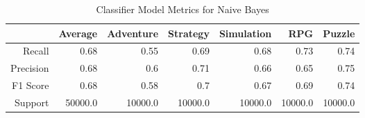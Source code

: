 \begin{table}[h]
    \centering
    \begin{tabular}{r|r|r|r|r|r|r}
        & Average & Adventure & Strategy & Simulation & RPG & Puzzle \\\hline
        Recall      & 0.68 & 0.55 & 0.69 & 0.68 & 0.73 & 0.74\\
        Precision   & 0.68 & 0.6 & 0.71 & 0.66 & 0.65 & 0.75\\
        F1 Score    & 0.68 & 0.58 & 0.7 & 0.67 & 0.69 & 0.74\\
        Support     & 50000.0 & 10000.0 & 10000.0 & 10000.0 & 10000.0 & 10000.0
\end{tabular}
    \caption{Classifier Model Metrics for Naive Bayes}
    \label{tab:model_metrics_naive_bayes}
\end{table}